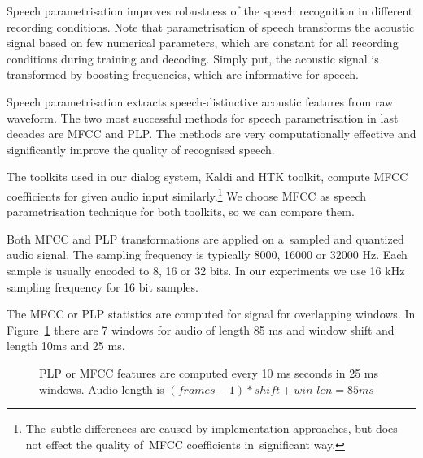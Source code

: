 Speech parametrisation improves robustness of the speech recognition in different recording conditions.
Note that parametrisation of speech transforms the acoustic signal based on few numerical parameters,
which are constant for all recording conditions during training and decoding.
Simply put, the acoustic signal is transformed by boosting frequencies, which are informative for speech.

Speech parametrisation extracts speech-distinctive acoustic features from raw waveform.
The two most successful methods for speech parametrisation in last decades are 
\ac{MFCC}\cite{davis1980comparison} and \ac{PLP}\cite{hermansky1990perceptual}.
The methods are very computationally effective and significantly improve the quality of recognised speech.


The toolkits used in our dialog system, Kaldi and \ac{HTK} toolkit,
compute \ac{MFCC} coefficients for given audio input similarly.\footnote{The~subtle differences are caused by implementation approaches, but does not effect the quality of~\ac{MFCC} coefficients in~significant way.}
We choose \ac{MFCC} as speech parametrisation technique for both toolkits,
so we can compare them.

Both \ac{MFCC} and \ac{PLP} transformations are applied on a~sampled and quantized audio signal.
The sampling frequency is typically 8000, 16000 or 32000 Hz.
Each sample is usually encoded to 8, 16 or 32 bits. 
In our experiments we use 16 kHz sampling frequency for 16 bit samples.  

The \ac{MFCC} or \ac{PLP} statistics are computed for signal for overlapping windows.
In Figure~\ref{fig:mfcc_window} there are 7 windows 
for audio of length 85 ms and window shift and length 10ms and 25 ms.

\begin{figure}[!htp]
    \begin{center}
    
    \caption{\ac{PLP} or \ac{MFCC} features are computed every 10 ms seconds in 25 ms windows.
    Audio length is $(frames-1)*shift + win\_len = 85ms$}
    \label{fig:mfcc_window} 
    \end{center}
\end{figure}

